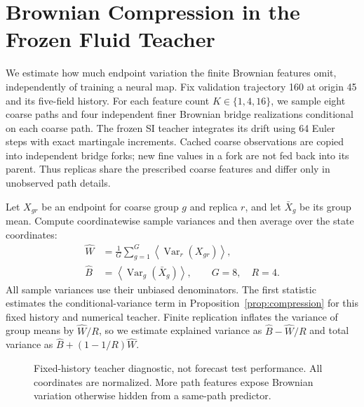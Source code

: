 \section{Brownian Compression in the Frozen Fluid Teacher}\label{app:ns-compression}
We estimate how much endpoint variation the finite Brownian features omit, independently of training a neural map. Fix validation trajectory 160 at origin 45 and its five-field history. For each feature count $K\in\{1,4,16\}$, we sample eight coarse paths and four independent finer Brownian bridge realizations conditional on each coarse path. The frozen SI teacher integrates its drift using 64 Euler steps with exact martingale increments. Cached coarse observations are copied into independent bridge forks; new fine values in a fork are not fed back into its parent. Thus replicas share the prescribed coarse features and differ only in unobserved path details.

Let $X_{gr}$ be an endpoint for coarse group $g$ and replica $r$, and let $\bar X_g$ be its group mean. Compute coordinatewise sample variances and then average over the state coordinates:
\begin{align}
 \widehat W&=\frac1G\sum_{g=1}^G
 \left\langle\operatorname{Var}_{r}(X_{gr})\right\rangle,\\
 \widehat B&=\left\langle\operatorname{Var}_{g}(\bar X_g)\right\rangle,
 \qquad G=8,\quad R=4.
\end{align}
All sample variances use their unbiased denominators. The first statistic estimates the conditional-variance term in Proposition~\ref{prop:compression} for this fixed history and numerical teacher. Finite replication inflates the variance of group means by $\widehat W/R$, so we estimate explained variance as $\widehat B-\widehat W/R$ and total variance as $\widehat B+(1-1/R)\widehat W$.

\begin{figure}[t]
\centering
{}
\caption{Fixed-history teacher diagnostic, not forecast test performance. All coordinates are normalized. More path features expose Brownian variation otherwise hidden from a same-path predictor.}
\label{fig:ns-compression}
\end{figure}


